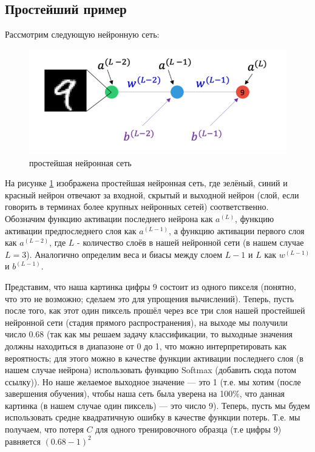 \documentclass[a4paper, 10pt, openany]{book} %
\begin{document}
	\subsection{Простейший пример}
	
	Рассмотрим следующую нейронную сеть:
	
	\begin{figure}[h!]
		\centering
		\includegraphics[width=\linewidth]{pictures/backpropagation/1-1-1_network.png}
		\caption{простейшая нейронная сеть}
		\label{simplest_nn}
	\end{figure}
	
	На рисунке \ref{simplest_nn} изображена простейшая нейронная сеть, где зелёный, синий и красный нейрон отвечают за входной, скрытый и выходной нейрон (слой, если говорить в терминах более крупных нейронных сетей) соответственно. Обозначим функцию активации последнего нейрона как $a^{(L)}$, функцию активации предпоследнего слоя как $a^{(L-1)}$, а функцию активации первого слоя как $a^{(L-2)}$, где $L$ - количество слоёв в нашей нейронной сети (в нашем случае $L=3$). Аналогично определим веса и биасы между слоем $L-1$ и $L$ как $w^{(L-1)}$ и $b^{(L-1)}$.
	
	Представим, что наша картинка цифры $9$ состоит из одного пикселя (понятно, что это не возможно; сделаем это для упрощения вычислений). Теперь, пусть после того, как этот один пиксель прошёл через все три слоя нашей простейшей нейронной сети (стадия прямого распространения), на выходе мы получили число 0.68 (так как мы решаем задачу классификации, то выходные значения должны находиться в диапазоне от 0 до 1, что можно интерпретировать как вероятность; для этого можно в качестве функции активации последнего слоя (в нашем случае нейрона) использовать функцию Softmax (добавить сюда потом ссылку)). Но наше желаемое выходное значение --- это 1 (т.е. мы хотим (после завершения обучения), чтобы наша сеть была уверена на 100\%, что данная картинка (в нашем случае один пиксель) --- это число 9). Теперь, пусть мы будем использовать средне квадратичную ошибку в качестве функции потерь. Т.е. мы получаем, что потеря $C$ для одного тренировочного образца (т.е цифры 9) равняется $(0.68-1)^2$
	
\end{document}
